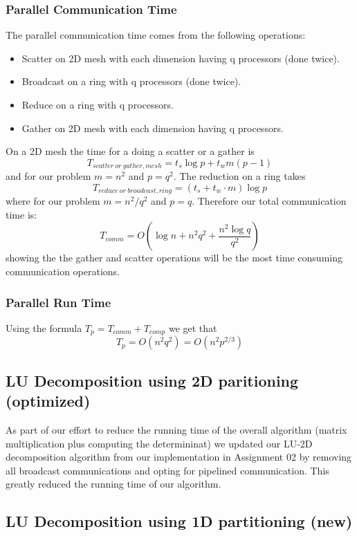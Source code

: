 \documentclass{article}
\begin{document}
\subsubsection{Parallel Communication Time}

The parallel communication time comes from the following operations:
\begin{itemize}
  \item Scatter on 2D mesh with each dimension having q processors (done twice).
  \item Broadcast on a ring with q processors (done twice).
  \item Reduce on a ring with q processors.
  \item Gather on 2D mesh with each dimension having q processors.
\end{itemize}

On a 2D mesh the time for a doing a scatter or a gather is
$$T_{{scatter~or~gather},{mesh}} = t_s \log{p} + t_w  m (p-1)$$ and for our
problem $m = n^2$ and $p = q^2$.  The reduction on a ring takes
$$T_{{reduce~or~broadcast},{ring}} = (t_s + t_w\cdot m) \log{p} $$ where for our
problem $m = n^2 / q^2$ and $p = q$.  Therefore our total communication time is:
$$T_{{comm}} = O(\log{n} + n^2 q^2 + \frac{n^2 \log{q}}{q^2} )$$ showing the the
gather and scatter operations will be the most time consuming communication
operations.

\subsubsection{Parallel Run Time}

Using the formula $T_p = T_{{comm}} + T_{{comp}}$ we get that $$T_p = O(n^2
q^2) = O(n^2 p^{2/3})$$

\subsection{LU Decomposition using 2D paritioning (optimized)}

As part of our effort to reduce the running time of the overall algorithm
(matrix multiplication plus computing the determininat) we updated our LU-2D
decomposition algorithm from our implementation in Assignment 02 by removing all
broadcast communications and opting for pipelined communication.  This greatly
reduced the running time of our algorithm.

\subsection{LU Decomposition using 1D partitioning (new)}
\end{document}
